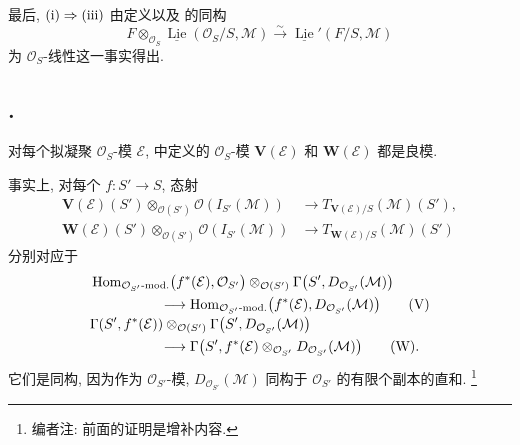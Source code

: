 最后, \(\textup{(i)}\Rightarrow\textup{(iii)}\) 由定义以及
 的同构
\[
 F\otimes_{\mathcal O_S}
 \underline{\operatorname{Lie}}(\mathcal O_S/S,\mathcal M)
 \xrightarrow{\sim}
 \underline{\operatorname{Lie}}'(F/S,\mathcal M)
\]
为 \(\mathcal O_S\)-线性这一事实得出.

\subsection*{.}
对每个拟凝聚 \(\mathcal O_S\)-模 \(\mathcal E\),
 中定义的 \(\mathcal O_S\)-模
\(\mathbf V(\mathcal E)\) 和 \(\mathbf W(\mathcal E)\) 都是良模.

事实上, 对每个 \(f:S'\to S\), 态射
\[
\begin{aligned}
 \mathbf V(\mathcal E)(S')\otimes_{\mathcal O(S')}
   \mathcal O(I_{S'}(\mathcal M))
 &\longrightarrow T_{\mathbf V(\mathcal E)/S}(\mathcal M)(S'),\\
 \mathbf W(\mathcal E)(S')\otimes_{\mathcal O(S')}
   \mathcal O(I_{S'}(\mathcal M))
 &\longrightarrow T_{\mathbf W(\mathcal E)/S}(\mathcal M)(S')
\end{aligned}
\]
分别对应于
\[
\begin{aligned}
 &\operatorname{Hom}_{\mathcal O_{S'}\text{-mod.}}
   \bigl(f^*(\mathcal E),\mathcal O_{S'}\bigr)
 \otimes_{\mathcal O(S')}
 \Gamma\bigl(S',D_{\mathcal O_{S'}}(\mathcal M)\bigr)\\
 &\hspace{5em}\longrightarrow
 \operatorname{Hom}_{\mathcal O_{S'}\text{-mod.}}
   \bigl(f^*(\mathcal E),D_{\mathcal O_{S'}}(\mathcal M)\bigr)
 \qquad\textup{(V)}
\\[-2pt]
 &\Gamma(S',f^*(\mathcal E))
 \otimes_{\mathcal O(S')}
 \Gamma\bigl(S',D_{\mathcal O_{S'}}(\mathcal M)\bigr)\\
 &\hspace{5em}\longrightarrow
 \Gamma\bigl(S',f^*(\mathcal E)
   \otimes_{\mathcal O_{S'}}D_{\mathcal O_{S'}}(\mathcal M)\bigr)
 \qquad\textup{(W)}.
\end{aligned}
\]
它们是同构, 因为作为 \(\mathcal O_{S'}\)-模,
\(D_{\mathcal O_{S'}}(\mathcal M)\) 同构于 \(\mathcal O_{S'}\) 的有限个副本的直和.
\footnote{编者注: 前面的证明是增补内容.}


